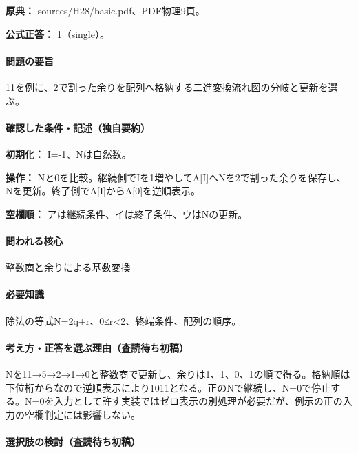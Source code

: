\noindent\textbf{原典：} sources/H28/basic.pdf、PDF物理9頁。

\textbf{公式正答：} 1（single）。

\paragraph{問題の要旨} 11を例に、2で割った余りを配列へ格納する二進変換流れ図の分岐と更新を選ぶ。

\paragraph{確認した条件・記述（独自要約）}\mbox{}\par

\noindent\textbf{初期化：} I=-1、Nは自然数。\par

\noindent\textbf{操作：} Nと0を比較。継続側でIを1増やしてA[I]へNを2で割った余りを保存し、Nを更新。終了側でA[I]からA[0]を逆順表示。\par

\noindent\textbf{空欄順：} アは継続条件、イは終了条件、ウはNの更新。\par

\paragraph{問われる核心} 整数商と余りによる基数変換

\paragraph{必要知識} 除法の等式N=\allowbreak{}2q+r、0≤r<2、終端条件、配列の順序。

\paragraph{考え方・正答を選ぶ理由（査読待ち初稿）} Nを11→5→2→1→0と整数商で更新し、余りは1、1、0、1の順で得る。格納順は下位桁からなので逆順表示により1011となる。正のNで継続し、N=\allowbreak{}0で停止する。N=\allowbreak{}0を入力として許す実装ではゼロ表示の別処理が必要だが、例示の正の入力の空欄判定には影響しない。

\paragraph{選択肢の検討（査読待ち初稿）}\mbox{}\par

